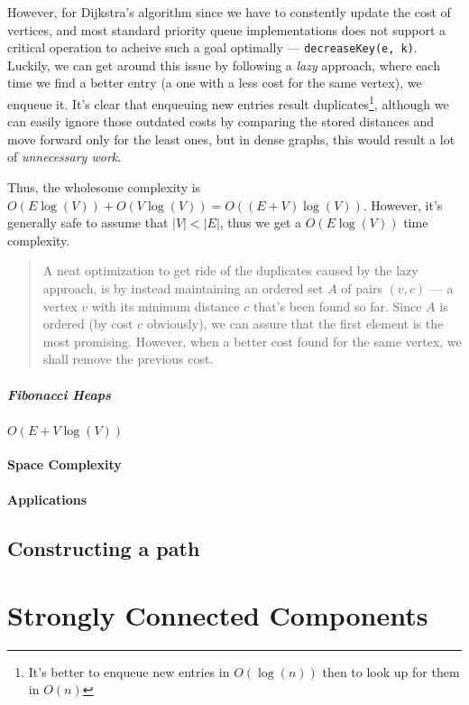 \documentclass[12pt]{article}
\begin{document}
However, for Dijkstra's algorithm since we have to constently update the cost of vertices, and most standard priority queue implementations does not support a critical operation to acheive such a goal optimally --- \texttt{decreaseKey(e, k)}. Luckily, we can get around this issue by following a \textit{lazy} approach, where each time we find a better entry (a one with a less cost for the same vertex), we enqueue it. It's clear that enqueuing new entries result duplicates\footnote{It's better to enqueue new entries in $O(\log(n))$ then to look up for them in $O(n)$}, although we can easily ignore those outdated costs by comparing the stored distances and move forward only for the least ones, but in dense graphs, this would result a lot of \textit{unnecessary work}.

Thus, the wholesome complexity is $O(E\log(V)) + O(V\log(V)) = O((E + V)\log(V))$. However, it's generally safe to assume that $|V| < |E|$, thus we get a $O(E\log(V))$ time complexity.

\begin{quotation}
  A neat optimization to get ride of the duplicates caused by the lazy approach, is by instead maintaining an ordered set $A$ of pairs $(v, c)$ --- a vertex $v$ with its minimum distance $c$ that's been found so far. Since $A$ is ordered (by cost $c$ obviously), we can assure that the first element is the most promising. However, when a better cost found for the same vertex, we shall remove the previous cost.
\end{quotation}


\subparagraph{Fibonacci Heaps}

$O(E + V\log(V))$

\paragraph{Space Complexity}

\paragraph{Applications}

\subsection{Constructing a path}

\section{Strongly Connected Components}
\end{document}
